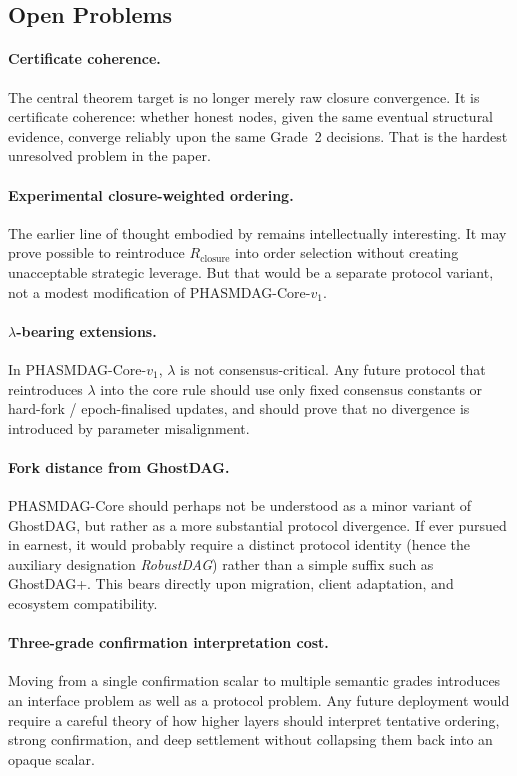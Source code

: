 \documentclass[11pt]{article}
\theoremstyle{definition}
\theoremstyle{plain}
\theoremstyle{remark}
\newcommand{\Rcls}{R_{\mathrm{closure}}} %
\begin{document}
\subsection{Open Problems}\label{sec:open}

\paragraph{Certificate coherence.}
The central theorem target is no longer merely raw closure convergence.
It is certificate coherence:
whether honest nodes, given the same eventual structural evidence, converge
reliably upon the same Grade~2 decisions.
That is the hardest unresolved problem in the paper.

\paragraph{Experimental closure-weighted ordering.}
The earlier line of thought embodied by 
remains intellectually interesting.
It may prove possible to reintroduce $\Rcls$ into order selection without
creating unacceptable strategic leverage.
But that would be a separate protocol variant, not a modest modification of
PHASMDAG-Core-$v_1$.

\paragraph{$\lambda$-bearing extensions.}
In PHASMDAG-Core-$v_1$, $\lambda$ is not consensus-critical.
Any future protocol that reintroduces $\lambda$ into the core rule should use
only fixed consensus constants or hard-fork / epoch-finalised updates, and
should prove that no divergence is introduced by parameter misalignment.

\paragraph{Fork distance from GhostDAG.}
PHASMDAG-Core should perhaps not be understood as a minor variant of GhostDAG,
but rather as a more substantial protocol divergence.
If ever pursued in earnest, it would probably require a distinct protocol
identity (hence the auxiliary designation \emph{RobustDAG}) rather than a
simple suffix such as GhostDAG+.
This bears directly upon migration, client adaptation, and ecosystem
compatibility.

\paragraph{Three-grade confirmation interpretation cost.}
Moving from a single confirmation scalar to multiple semantic grades introduces
an interface problem as well as a protocol problem.
Any future deployment would require a careful theory of how higher layers
should interpret tentative ordering, strong confirmation, and deep settlement
without collapsing them back into an opaque scalar.
\end{document}
